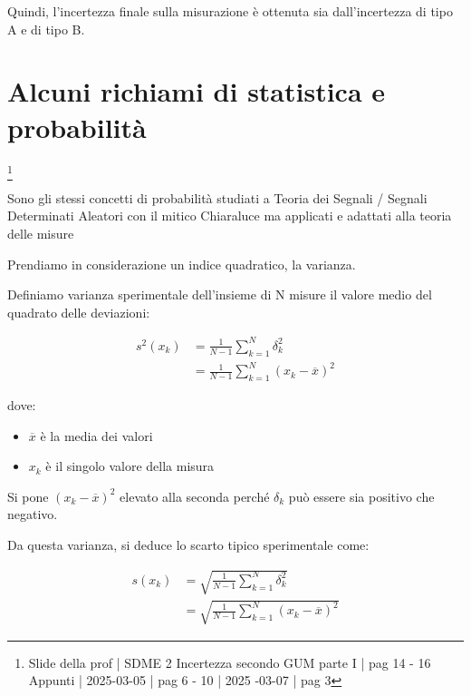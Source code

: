 Quindi, l'incertezza finale sulla misurazione è ottenuta sia dall'incertezza di tipo A e di tipo B. \newline 

\newpage 

\section{Alcuni richiami di statistica e probabilità}
\footnote{Slide della prof | SDME 2 Incertezza secondo GUM parte I | pag 14 - 16 \\  
Appunti | 2025-03-05 | pag 6 - 10 | 2025 -03-07 | pag 3}

\begin{tcolorbox}
    Sono gli stessi concetti di probabilità studiati a Teoria dei Segnali / Segnali Determinati Aleatori con il mitico Chiaraluce 
    ma applicati e adattati alla teoria delle misure
\end{tcolorbox}

Prendiamo in considerazione un indice quadratico, la varianza. \newline 

Definiamo varianza sperimentale dell'insieme di N misure il valore medio del quadrato delle deviazioni: 

{
    \Large 
    \begin{equation}
        \begin{split}
            s^{2} (x_k) 
            &= 
            \frac{1}{N - 1}
            \sum_{k = 1}^{N}
            \delta^{2}_k
            \\
            &= 
            \frac{1}{N - 1}
            \sum_{k = 1}^{N}
            (x_k - \overline{x})^{2}
        \end{split}
    \end{equation}
}

dove: 

\begin{itemize}
    \item $\overline{x}$ è la media dei valori 
    \item $x_k$ è il singolo valore della misura
\end{itemize}

Si pone $(x_k - \overline{x})^{2}$ elevato alla seconda perché $\delta_k$ può essere sia positivo che negativo. \newline

Da questa varianza, si deduce lo scarto tipico sperimentale come: 

{
    \Large 
    \begin{equation}
        \begin{split}
            s(x_k) 
            &=
            \sqrt
            { 
            \frac{1}{N - 1}
            \sum_{k = 1}^{N}
            \delta^{2}_k
            }
            \\
            &= 
            \sqrt
            {
            \frac{1}{N - 1}
            \sum_{k = 1}^{N}
            (x_k - \overline{x})^{2}
            }
        \end{split}
    \end{equation}
}

